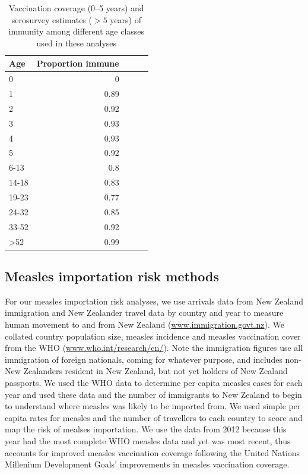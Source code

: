 \documentclass{article}
\begin{document}
\begin{table}[htdp]
\begin{center}
\begin{tabular}{lrrrr}
\hline
Age &  Proportion immune\\
\hline
0  & 0\\
1  & 0.89\\
2	& 0.92\\
3	& 0.93\\
4	& 0.93\\
5	& 0.92\\
6-13	& 0.8\\
14-18	& 0.83\\
19-23	& 0.77\\
24-32	& 0.85\\
33-52	& 0.92\\
>52	& 0.99\\
\hline
\end{tabular}
\end{center}
\caption{Vaccination coverage (0--5 years) and serosurvey estimates ($>5$ years) of immunity among different age classes used in these analyses}
\label{table:sero}
\end{table}%

\subsection{Measles importation risk methods}

For our measles importation risk analyses, we use arrivals data from New Zealand immigration and New Zealander travel data by country and year to measure human movement to and from New Zealand  (\href{http://www.immigration.govt.nz/}{www.immigration.govt.nz}). We collated country population size, measles incidence and measles vaccination cover from the WHO (\href{http://www.who.int/research/en/}{www.who.int/research/en/}). Note the immigration figures use all immigration of foreign nationals, coming for whatever purpose, and includes non-New Zealanders resident in New Zealand, but not yet holders of New Zealand passports. We used the WHO data to determine per capita measles cases for each year and used these data and the number of immigrants to New Zealand to begin to understand where measles was likely to be imported from. We used simple per capita rates for measles and the number of travellers to each country to score and map the risk of mealses importation. We use the data from 2012 because this year had the most complete WHO measles data and yet was most recent, thus accounts for improved measles vaccination coverage following the United Nations Millenium Development Goals' improvements in measles vaccination coverage. 
\end{document}
